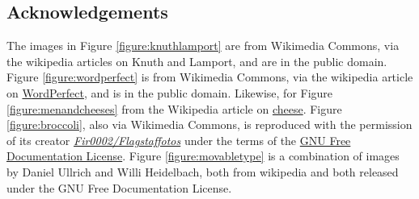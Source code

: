 \begin{refsection}
\section{Acknowledgements}

 The images in Figure \ref{figure:knuthlamport} are from Wikimedia Commons, via the wikipedia articles on Knuth and Lamport, and are in the public domain. Figure \ref{figure:wordperfect} is from Wikimedia Commons, via the wikipedia article on \href{http://en.wikipedia.org/wiki/WordPerfect}{WordPerfect}, and is in the public domain. Likewise, for Figure \ref{figure:menandcheeses} from the Wikipedia article on \href{http://en.wikipedia.org/wiki/Cheese}{cheese}. Figure \ref{figure:broccoli}, also via Wikimedia Commons, is reproduced with the permission of its creator \href{http://commons.wikimedia.org/wiki/User:Fir0002}{\emph{Fir0002/Flagstaffotos}} under the terms of the \href{http://commons.wikimedia.org/wiki/Commons:GNU_Free_Documentation_License_1.2}{GNU Free Documentation License}. Figure \ref{figure:movabletype} is a combination of images by Daniel Ullrich and Willi Heidelbach, both from wikipedia and both released under the GNU Free Documentation License.

\printbibliography[heading=subbibliography]
\end{refsection}

\restoregeometry
\setlength{\parskip}{4pt plus 1pt}%
\setlength{\parindent}{0pt}
\fancyheadoffset{0cm} %

\endinput

\section{License}

The text of this exercise is licensed under the terms of the \href{http://creativecommons.org/licenses/by/3.0/}{Creative Commons Attribution 2.0 Generic (CC BY 3.0) License}. 




\appendix

\section{Fire And Ice}
\label{appendix:fireandice}

